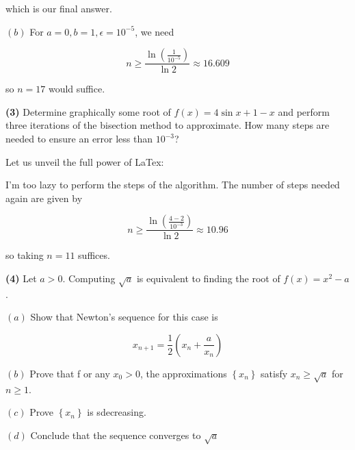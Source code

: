\documentclass[12pt]{article}
\theoremstyle{definition}
\begin{document}
which is our final answer. 

$(b)$ For $a = 0, b = 1, \epsilon = 10^{-5}$, we need 

\begin{equation*}
    n \geq \frac{\ln \left( \frac{1}{10^{-5}} \right) }{\ln 2} \approx 16.609
\end{equation*}

so $n = 17$ would suffice.

\pagebreak 

\begin{shaded}
    \textbf{(3)} Determine  graphically some root of $f(x) = 4\sin x + 1 - x$
    and perform three iterations of the bisection method to approximate. How
    many steps are needed to ensure an error less than $10^{-3}$?
\end{shaded}

Let us unveil the full power of LaTex:

\begin{center}
\end{center}

I'm too lazy to perform the steps of the algorithm. The number of steps needed
again are given by 

\begin{equation*}
    n \geq \frac{\ln \left( \frac{4-2}{10^{-3}} \right) }{\ln 2} \approx 10.96
\end{equation*}

so taking $n = 11$ suffices.

\pagebreak 

\begin{shaded}
    \textbf{(4)} Let $a > 0$. Computing $\sqrt{a} $ is equivalent to finding the
    root of $f(x) = x^2 -  a$. 

    $(a)$ Show that Newton's sequence for this case is 

    \begin{equation*}
        x_{n+1} = \frac{1}{2}\left( x_n + \frac{a}{x_n} \right)  
    \end{equation*}

    $(b)$ Prove that f or any $x_0 > 0$, the approximations $\left\{ x_n
    \right\} $ satisfy $x_n \geq \sqrt{a} $ for $n \geq 1$. 

    $(c)$ Prove $\left\{ x_n \right\} $ is sdecreasing. 

    $(d)$ Conclude that the sequence converges to $\sqrt{a} $
\end{shaded}
\end{document}
